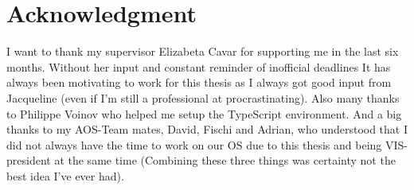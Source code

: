 
\chapter*{Acknowledgment}

I want to thank my supervisor Elizabeta Cavar for supporting me in the last six months.
Without her input and constant reminder of inofficial deadlines
It has always been motivating to work for this thesis as I always got good input from Jacqueline
(even if I'm still a professional at procrastinating). Also many thanks to Philippe Voinov who helped me setup the TypeScript environment. And a big thanks to my AOS-Team mates, David, Fischi and Adrian, who understood that I did not always have the time to work on our OS due to this thesis and being VIS-president at the same time (Combining these three things was certainty not the best idea I've ever had).


